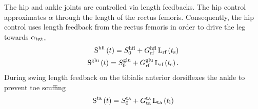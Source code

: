 The hip and ankle joints are controlled via length feedbacks. The hip control
approximates $\alpha$ through the length of the rectus femoris. Consequently,
the hip control uses length feedback from the rectus femoris in order to drive
the leg towards $\alpha_{\textnormal{tgt}}$,
\begin{align}
    \func{S}[][\tn{hfl}]{t} = S_0^\tn{hfl} + G_\tn{rf}^\tn{hfl}
        \func{L}[\tn{rf}]{t_\tn{s}} \\
    \func{S}[][\tn{glu}]{t} = S_0^\tn{glu} + G_\tn{rf}^\tn{glu}
        \func{L}[\tn{rf}]{t_\tn{s}}.
\end{align}
During swing length feedback on the tibialis anterior dorsiflexes the ankle to
prevent toe scuffing
\begin{align}
    \func{S}[][\tn{ta}]{t} = S_0^\tn{ta} + G_\tn{ta}^\tn{ta}
        \func{L}[\tn{ta}]{t_\tn{l}}
\end{align}
